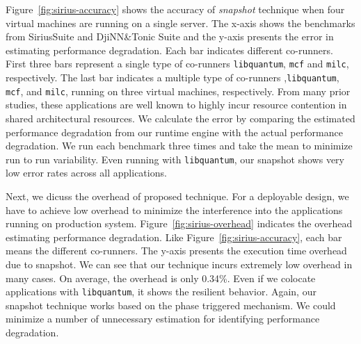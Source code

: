 \documentclass{sig-alternate}
\begin{document}
  
Figure~\ref{fig:sirius-accuracy} shows the accuracy of \textit{snapshot} technique when four virtual machines are running on a single server. The x-axis shows the benchmarks from SiriusSuite and DjiNN\&Tonic Suite and the y-axis presents the error in estimating performance degradation. Each bar indicates different co-runners. First three bars represent a single type of co-runners \texttt{libquantum}, \texttt{mcf} and \texttt{milc}, respectively. The last bar indicates a multiple type of co-runners ,\texttt{libquantum}, \texttt{mcf}, and \texttt{milc}, running on three virtual machines, respectively. From many prior studies, these applications are well known to highly incur resource contention in shared  architectural resources. We calculate the error by comparing the estimated performance degradation from our runtime engine with the actual performance degradation. We run each benchmark three times and take the mean to minimize run to run variability. Even running with \texttt{libquantum}, our snapshot shows very low error rates across all applications. %

Next, we dicuss the overhead of proposed technique. For a deployable design, we have to achieve low overhead to minimize the interference into the applications running on production system.  
Figure~\ref{fig:sirius-overhead} indicates the overhead estimating performance degradation. Like Figure~\ref{fig:sirius-accuracy}, each bar means the different co-runners. The y-axis presents the execution time overhead due to snapshot. We can see that our technique incurs extremely low overhead in many cases. On average, the overhead is only 0.34\%. Even if we colocate applications with \texttt{libquantum}, it shows the resilient behavior. Again, our snapshot technique works based on the phase triggered mechanism. We could minimize a number of unnecessary estimation for identifying performance degradation.
\end{document}
